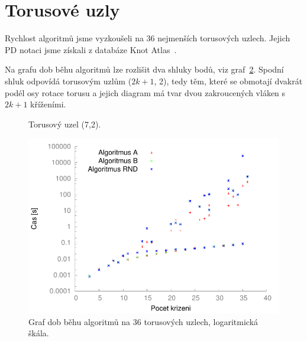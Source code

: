 \section{Torusové uzly} \label{torus}



Rychlost algoritmů jsme vyzkoušeli na 36 nejmenších torusových uzlech. Jejich PD notaci jsme získali z databáze Knot Atlas~\cite{knotatlas}.

Na grafu dob běhu algoritmů lze rozlišit dva shluky bodů, viz graf~\ref{obr03:torusSrov}. Spodní shluk odpovídá torusovým uzlům ($2k+1$, 2), tedy těm, které se obmotají dvakrát podél osy rotace torusu a jejich diagram má tvar dvou zakroucených vláken s $2k+1$ kříženími.

\begin{figure}[H]\centering
{}
\caption{Torusový uzel (7,2).}
\label{obr03:torus7}
\end{figure}

\begin{figure}[p]\centering
\includegraphics{../img/torusSrov}
\caption{Graf dob běhu algoritmů na 36 torusových uzlech, logaritmická škála.}
\label{obr03:torusSrov}
\end{figure}

